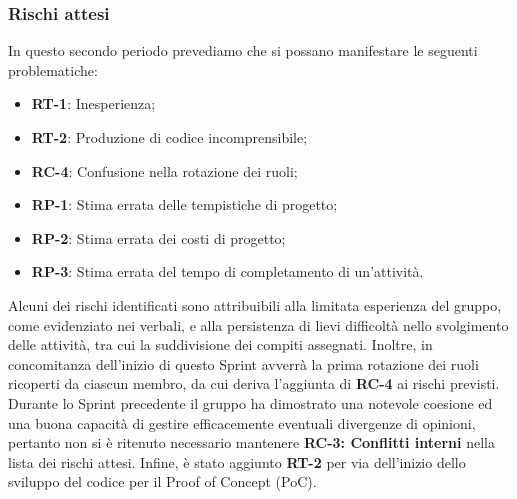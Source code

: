 \subsubsection{Rischi attesi}
In questo secondo periodo prevediamo che si possano manifestare le seguenti problematiche: 
\begin{itemize}
\setlength{\itemsep}{0em}
\item \textbf{RT-1}: Inesperienza;
\item \textbf{RT-2}: Produzione di codice incomprensibile;
\item \textbf{RC-4}: Confusione nella rotazione dei ruoli;
\item \textbf{RP-1}: Stima errata delle tempistiche di progetto;
\item \textbf{RP-2}: Stima errata dei costi di progetto;
\item \textbf{RP-3}: Stima errata del tempo di completamento di un’attività.
\end{itemize}
Alcuni dei rischi identificati sono attribuibili alla limitata esperienza del gruppo, come evidenziato nei verbali, e alla persistenza di lievi difficoltà nello svolgimento delle attività, tra cui la suddivisione dei compiti assegnati. Inoltre, in concomitanza dell'inizio di questo Sprint avverrà la prima rotazione dei ruoli ricoperti da ciascun membro, da cui deriva l'aggiunta di \textbf{RC-4} ai rischi previsti. Durante lo Sprint precedente il gruppo ha dimostrato una notevole coesione ed una buona capacità di gestire efficacemente eventuali divergenze di opinioni, pertanto non si è ritenuto necessario mantenere \textbf{RC-3: Conflitti interni} nella lista dei rischi attesi. Infine, è stato aggiunto \textbf{RT-2} per via dell'inizio dello sviluppo del codice per il Proof of Concept (PoC).
\clearpage
